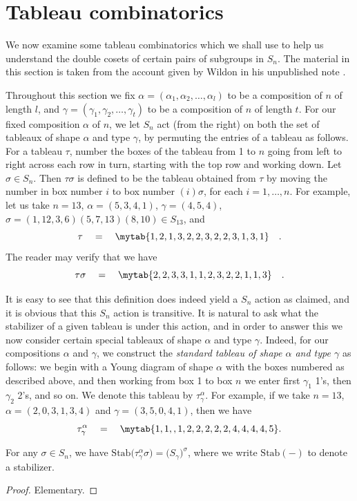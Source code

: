 \section{Tableau combinatorics}
We now examine some tableau combinatorics which we shall use to help us understand the double cosets of certain pairs of subgroups in
$S_n$. The material in this section is taken from the account given by Wildon in his unpublished note \cite{WLDDCR}.

Throughout this section we fix $\alpha = (\alpha_1,\alpha_2,\ldots,\alpha_l)$ to be a composition of $n$ of length $l$, and
$\gamma = (\gamma_1,\gamma_2,\ldots,\gamma_t)$ to be a composition of $n$ of length $t$.
For our fixed composition $\alpha$ of $n$, we let $S_n$ act (from the right) on both the set of tableaux of shape $\alpha$ and type
$\gamma$, by permuting the entries of a tableau as follows.
For a tableau $\tau$, number the boxes of the tableau from 1 to $n$ going from left to right across each row in turn, starting with the
top row and working down. Let $\sigma \in S_n$. Then $\tau\sigma$ is defined to be the tableau obtained from $\tau$ by moving the number
in box number $i$ to box number $(i)\sigma$, for each $i=1,\ldots,n$. For example, let us take $n=13$,
$\alpha = (5,3,4,1)$, $\gamma = (4,5,4)$, $\sigma = (1,12,3,6)(5,7,13)(8,10) \in S_{13}$, and
\[
\tau \quad=\quad 
\mytab{
{{1,2,1,3,2},
{2,3,2},
{2,3,1,3},
{1}}
}\quad.
\]
The reader may verify that we have
\[
\tau\sigma \quad=\quad 
\mytab{
{{2,2,3,3,1},
{1,2,3},
{2,2,1,1},
{3}}
}\quad.\]

It is easy to see that this definition does indeed yield a $S_n$ action as claimed, and it is obvious that this $S_n$ action is
transitive. It is natural to ask what the stabilizer of a given tableau is under this action, and in order to answer this we now consider
certain special tableaux of shape $\alpha$ and type $\gamma$. Indeed, for our compositions $\alpha$ and $\gamma$, we
construct the \textit{standard tableau of shape $\alpha$ and type $\gamma$} as follows: we begin with a Young diagram of shape $\alpha$
with the boxes numbered as described above, and then working from box 1 to box $n$ we enter first $\gamma_1$ 1's, then $\gamma_2$ 2's,
and so on. We denote this tableau by $\tau^\alpha_{\gamma}$. For example, if we take
$n=13$, $\alpha = (2,0,3,1,3,4)$ and $\gamma=(3,5,0,4,1)$, then we have
\[
\tau^\alpha_{\gamma}\quad=\quad
\mytab{
{{1,1},
{},
{1,2,2},
{2},
{2,2,4},
{4,4,4,5}}
}.
\]

\begin{prop}\label{tab_stab:prop}
For any $\sigma \in S_n$, we have $\mathrm{Stab}\bigl(\tau^\alpha_\gamma\sigma\bigr) = \bigl(S_\gamma\bigr)^\sigma$,
where we write $\mathrm{Stab}(-)$ to denote a stabilizer.
\end{prop}
\begin{proof}Elementary.\end{proof}

